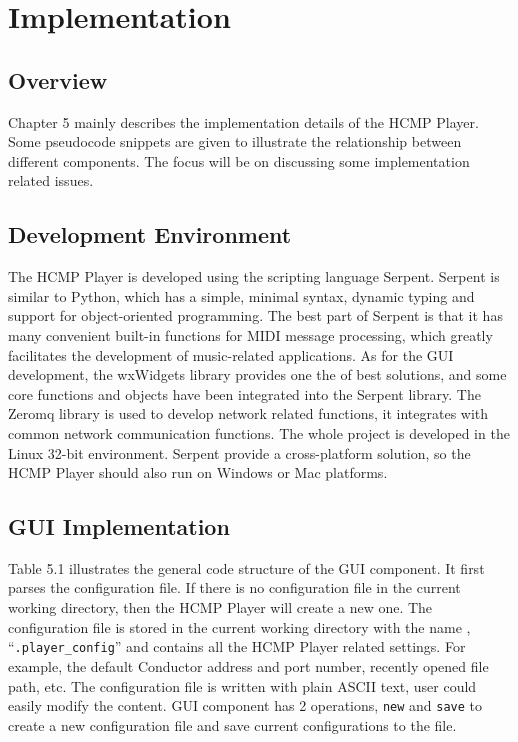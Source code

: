 
\chapter{Implementation} %



\ifpdf
    \graphicspath{{X/figures/PNG/}{X/figures/PDF/}{X/figures/}}
\else
    \graphicspath{{X/figures/EPS/}{X/figures/}}
\fi

\section{Overview}
Chapter 5 mainly describes the implementation details of the HCMP Player. Some
pseudocode snippets are given to illustrate the relationship between 
different components. The focus will be on discussing some implementation 
related issues. 

\section{Development Environment}

The HCMP Player is developed using the scripting language Serpent\cite{Serpent}. 
Serpent is similar to Python, which has a simple, 
minimal syntax, dynamic typing and support for object-oriented programming. 
The best part of Serpent is 
that it has many convenient built-in functions for MIDI message processing, 
which greatly facilitates the development of music-related applications. 
As for the GUI development, the wxWidgets \cite{wxWidget} library provides one 
the of best solutions, and some core functions and objects have been 
integrated into the Serpent library. The Zeromq library is used to develop 
network related functions, it integrates with common network communication 
functions. The whole project is developed in the Linux 32-bit environment. 
Serpent provide a cross-platform solution, so the HCMP Player should also 
run on Windows or Mac platforms.

\section{GUI Implementation}
Table 5.1 illustrates the general code structure of the GUI component. 
It first parses the configuration file. If there is no configuration file 
in the current working directory, then the HCMP Player will create a new one.
The configuration file is stored in the current working directory with 
the name , ``\texttt{.player\_config}'' and contains all the HCMP Player  
related settings. For example, the default Conductor address and 
port number, recently opened file path, etc. The configuration file is written 
with plain ASCII text, user could easily modify the content. GUI 
component has 2 operations, \texttt{new} and \texttt{save} to create a new 
configuration file and save current configurations to the file.

